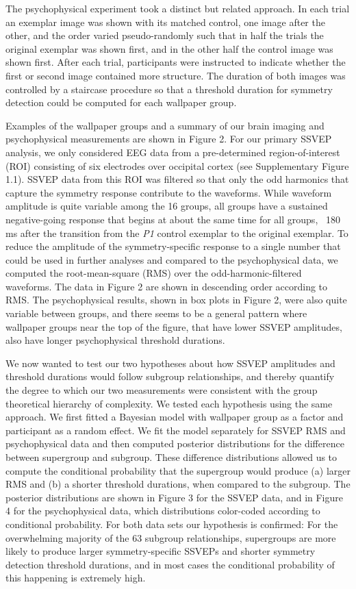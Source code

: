 \documentclass[11pt, twoside]{article}
\begin{document}
The psychophysical experiment took a distinct but related approach. In each trial an exemplar image was shown with its matched control, one image after the other, and the order varied pseudo-randomly such that in half the trials the original exemplar was shown first, and in the other half the control image was shown first. After each trial, participants were instructed to indicate whether the first or second image contained more structure. The duration of both images was controlled by a staircase procedure so that a threshold duration for symmetry detection could be computed for each wallpaper group. 

Examples of the wallpaper groups and a summary of our brain imaging and psychophysical measurements are shown in Figure 2. For our primary SSVEP analysis, we only considered EEG data from a pre-determined region-of-interest (ROI) consisting of six electrodes over occipital cortex (see Supplementary Figure 1.1). SSVEP data from this ROI was filtered so that only the odd harmonics that capture the symmetry response contribute to the waveforms. While waveform amplitude is quite variable among the 16 groups, all groups have a sustained negative-going response that begins at about the same time for all groups, ~180 ms after the transition from the \textit{P1} control exemplar to the original exemplar. To reduce the amplitude of the symmetry-specific response to a single number that could be used in further analyses and compared to the psychophysical data, we computed the root-mean-square (RMS) over the odd-harmonic-filtered waveforms. The data in Figure 2 are shown in descending order according to RMS. The psychophysical results, shown in box plots in Figure 2, were also quite variable between groups, and there seems to be a general pattern where wallpaper groups near the top of the figure, that have lower SSVEP amplitudes, also have longer psychophysical threshold durations. 

We now wanted to test our two hypotheses about how SSVEP amplitudes and threshold durations would follow subgroup relationships, and thereby quantify the degree to which our two measurements were consistent with the group theoretical hierarchy of complexity. We tested each hypothesis using the same approach. We first fitted a Bayesian model with wallpaper group as a factor and participant as a random effect. We fit the model separately for SSVEP RMS and psychophysical data and then computed posterior distributions for the difference between supergroup and subgroup. These difference distributions allowed us to compute the conditional probability that the supergroup would produce (a) larger RMS and (b) a shorter threshold durations, when compared to the subgroup. The posterior distributions are shown in Figure 3 for the SSVEP data, and in Figure 4 for the psychophysical data, which distributions color-coded according to conditional probability. For both data sets our hypothesis is confirmed: For the overwhelming majority of the 63 subgroup relationships, supergroups are more likely to produce larger symmetry-specific SSVEPs and shorter symmetry detection threshold durations, and in most cases the conditional probability of this happening is extremely high. 
\end{document}
